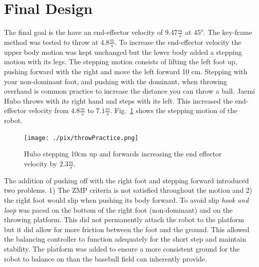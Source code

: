 \section{Final Design}\label{sec:finalDesign}

The final goal is the have an end-effector velocity of $9.47\frac{m}{s}$ at $45^o$.  
The key-frame method was tested to throw at $4.8\frac{m}{s}$.  
To increase the end-effector velocity the upper body motion was kept unchanged but the lower body added a stepping motion with its legs.
The stepping motion consists of lifting the left foot up, pushing forward with the right and move the left forward 10 cm.  
Stepping with your non-dominant foot, and pushing with the dominant, when throwing overhand is common practice to increase the distance you can throw a ball.  
Jaemi Hubo throws with its right hand and steps with its left.  
This increased the end-effector velocity from $4.8\frac{m}{s}$ to $7.1\frac{m}{s}$.
Fig.~\ref{fig:hubo-step} shows the stepping motion of the robot.

\begin{figure}[t]
  \centering
\texttt{[image: ./pix/throwPractice.png]}
  \caption{Hubo stepping 10cm up and forwards increasing the end effector velocity by $2.3\frac{m}{s}$.}
  \label{fig:hubo-step}
\end{figure}

The addition of pushing off with the right foot and stepping forward introduced two problems.  1) The ZMP criteria is not satisfied throughout the motion and 2) the right foot would slip when pushing its body forward.  
To avoid slip \textit{hook and loop} was paced on the bottom of the right foot (non-dominant) and on the throwing platform.  
This did not permanently attach the robot to the platform but it did allow for more friction between the foot and the ground.
This allowed the balancing controller to function adequately for the short step and maintain stability.
The platform was added to ensure a more consistent ground for the robot to balance on than the baseball field can inherently provide.

